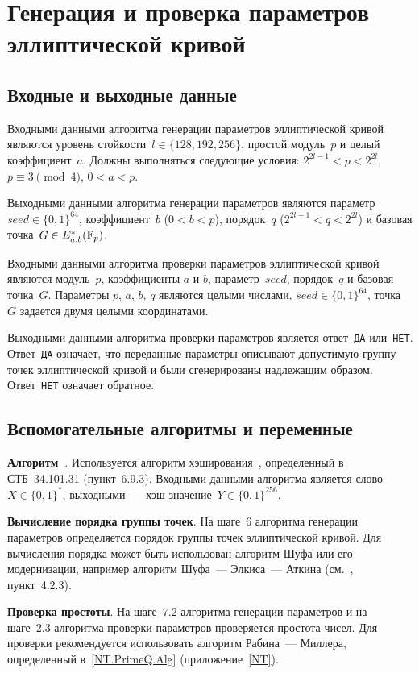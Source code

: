 \section{Генерация и проверка параметров эллиптической кривой}\label{PARAMS}

\subsection{Входные и выходные данные}

Входными данными алгоритма генерации параметров эллиптической кривой 
являются уровень стойкости~$l\in\{128,192,256\}$, 
простой модуль~$p$ и целый коэффициент~$a$.
%
Должны выполняться следующие условия: $2^{2l-1}<p<2^{2l}$,
$p\equiv 3\pmod{4}$, $0<a<p$.

Выходными данными алгоритма генерации параметров 
являются параметр~$seed\in\{0,1\}^{64}$, 
коэффициент~$b$ ($0<b<p$), 
порядок~$q$ ($2^{2l-1}<q<2^{2l}$) 
и базовая точка~$G\in E_{a,b}^*(\mathbb{F}_p)$.

Входными данными алгоритма проверки параметров эллиптической кривой
являются модуль~$p$, коэффициенты $a$ и $b$, 
параметр~$seed$, порядок~$q$ и базовая точка~$G$.
%
Параметры $p$, $a$, $b$, $q$ являются целыми числами,
$seed\in\{0,1\}^{64}$, точка~$G$ задается двумя целыми координатами.

Выходными данными алгоритма проверки параметров 
является ответ~\texttt{ДА} или~\texttt{НЕТ}. 
Ответ~\texttt{ДА} означает, что переданные параметры 
описывают допустимую группу точек эллиптической кривой
и были сгенерированы надлежащим образом.
Ответ~\texttt{НЕТ} означает обратное.

\subsection{Вспомогательные алгоритмы и переменные}
\label{PARAMS.Aux}

{\bf Алгоритм~}.
Используется алгоритм хэширования~,
определенный в СТБ~34.101.31 (пункт~6.9.3).
Входными данными алгоритма является слово~$X\in\{0,1\}^*$,
выходными~--- хэш-значение~$Y\in\{0,1\}^{256}$.

{\bf Вычисление порядка группы точек}.
На шаге~6 алгоритма генерации параметров 
определяется порядок группы точек эллиптической кривой.
%
Для вычисления порядка может быть использован алгоритм Шуфа
или его модернизации, например алгоритм Шуфа~--- Элкиса~--- Аткина
(см.~\cite{ECC}, пункт~4.2.3).

{\bf Проверка простоты}.
На шаге~7.2 алгоритма генерации параметров и на шаге~2.3
алгоритма проверки параметров проверяется простота чисел.
%
Для проверки рекомендуется использовать алгоритм 
Рабина~--- Миллера, определенный в~\ref{NT.PrimeQ.Alg}
(приложение~\ref{NT}).

